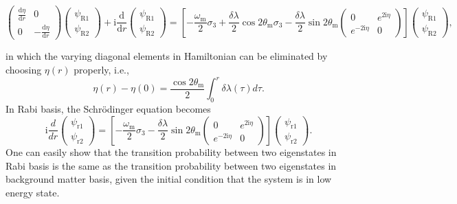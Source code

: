 \documentclass[%
reprint,
 amsmath,amssymb,
 prd,
]{revtex4-1}
\newcommand{\ri}{\mathrm{i}}
\begin{document}
\begin{widetext}
\begin{equation*}
    \begin{pmatrix}  \frac{\mathrm d\eta}{\mathrm dr}  & 0 \\ 0 & - \frac{\mathrm d\eta}{\mathrm d r}  \end{pmatrix} \begin{pmatrix} \psi_{\mathrm R1} \\ \psi_{\mathrm R2} \end{pmatrix} + \mathrm i \frac{\mathrm d}{\mathrm dr} \begin{pmatrix} \psi_{\mathrm R1} \\ \psi_{\mathrm R2} \end{pmatrix}
    = \left[ -\frac{\omega_{\mathrm m} }{2} \sigma_3  + \frac{\delta \lambda}{2} \cos 2\theta_{\mathrm m}  \sigma_3  - \frac{\delta \lambda}{2} \sin 2\theta_{\mathrm m} \begin{pmatrix} 0 & e^{2\mathrm i\eta} \\ e^{-2 \mathrm i\eta } & 0 \end{pmatrix}   \right] \begin{pmatrix} \psi_{\mathrm R1} \\ \psi_{\mathrm R2} \end{pmatrix},
\end{equation*}
\end{widetext}
in which the varying diagonal elements in Hamiltonian can be eliminated by choosing $\eta(r)$ properly, i.e.,
\begin{equation}
    \eta(r) - \eta(0) =  \frac{\cos 2\theta_{\mathrm{m}}}{2} \int_0^r \delta\lambda (\tau) d\tau.
\end{equation}
In Rabi basis, the Schr\"{o}dinger equation becomes
\begin{equation*}
    \ri \frac{d}{dr} \begin{pmatrix} \psi_{\mathrm r1} \\ \psi_{\mathrm r2} \end{pmatrix} = \left[ - \frac{\omega_{\mathrm m}}{2} \sigma_3 - \frac{\delta \lambda}{2} \sin 2\theta_{\mathrm m} \begin{pmatrix} 0 & e^{2\ri\eta} \\ e^{-2 \ri \eta } & 0 \end{pmatrix}\right] \begin{pmatrix} \psi_{\mathrm r1} \\ \psi_{\mathrm r2} \end{pmatrix}.
\end{equation*}
One can easily show that the transition probability between two eigenstates in Rabi basis is the same as the transition probability between two eigenstates in background matter basis, given the initial condition that the system is in low energy state.
\end{document}
